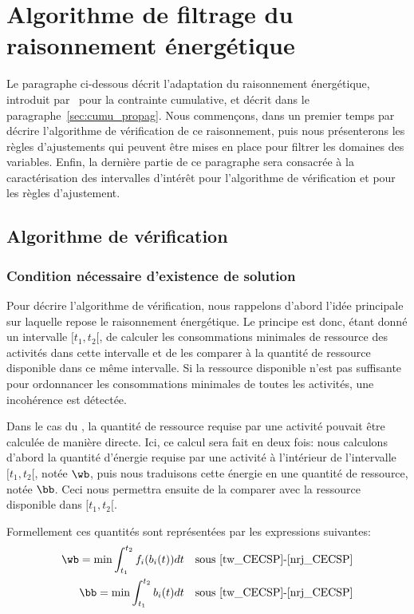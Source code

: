 \section{Algorithme de filtrage du raisonnement énergétique}
\label{sec:ER_CECSP}

Le paragraphe ci-dessous décrit l'adaptation du raisonnement
énergétique, introduit par~\cite{RELopez} pour la contrainte cumulative,
et décrit dans le paragraphe~\ref{sec:cumu_propag}. Nous commençons,
dans un premier temps par décrire l'algorithme de vérification de ce
raisonnement, puis nous présenterons les règles d'ajustements qui
peuvent être mises en place pour filtrer les domaines des
variables. Enfin, la dernière partie de ce paragraphe sera consacrée à
la caractérisation des intervalles d'intérêt pour l'algorithme de
vérification et pour les règles d'ajustement.

\subsection{Algorithme de vérification}

\subsubsection{Condition nécessaire d'existence de solution}
Pour décrire l'algorithme de vérification, nous rappelons d'abord
l'idée principale sur laquelle repose le raisonnement énergétique. Le
principe est donc, étant donné un intervalle $[t_1,t_2[$, de calculer
les consommations minimales de ressource des activités dans cette
intervalle et de les comparer à la quantité de ressource disponible
dans ce même intervalle. Si la ressource disponible n'est pas
suffisante pour ordonnancer les consommations minimales de toutes les
activités, une incohérence est détectée.

Dans le cas du \CUSP, la quantité de ressource requise par une
activité pouvait être calculée de manière directe. Ici, ce calcul sera
fait en deux fois: nous calculons d'abord la quantité d'énergie
requise par une activité à l'intérieur de l'intervalle $[t_1,t_2{[}$,
notée $\wb$, puis nous traduisons cette énergie en une quantité de
ressource, notée $\bb$. Ceci nous permettra ensuite de la comparer
avec la ressource disponible dans $[t_1,t_2{[}$.

Formellement ces quantités sont représentées par les expressions
suivantes: 
\begin{align}
  \wb= \min \int_{t_1}^{t_2} f_i(b_i(t))dt & & \text{sous 
\eqref{tw_CECSP}-\eqref{nrj_CECSP}}\\
  \bb= \min \int_{t_1}^{t_2} b_i(t)dt & & \text{sous 
\eqref{tw_CECSP}-\eqref{nrj_CECSP}} \label{eq:minConso}
\end{align}

